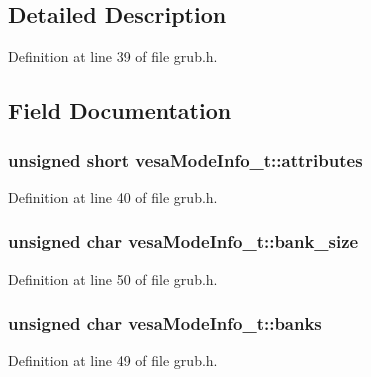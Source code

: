 \subsection{Detailed Description}


Definition at line 39 of file grub.\+h.



\subsection{Field Documentation}
\hypertarget{structvesaModeInfo__t_a339145bcfb50fc81609813734415d4db}{
\subsubsection[{attributes}]{\setlength{\rightskip}{0pt plus 5cm}unsigned short vesa\+Mode\+Info\+\_\+t\+::attributes}}\label{structvesaModeInfo__t_a339145bcfb50fc81609813734415d4db}


Definition at line 40 of file grub.\+h.

\hypertarget{structvesaModeInfo__t_a6f7476f0df157c2fc8969131512a9bc1}{
\subsubsection[{bank\+\_\+size}]{\setlength{\rightskip}{0pt plus 5cm}unsigned char vesa\+Mode\+Info\+\_\+t\+::bank\+\_\+size}}\label{structvesaModeInfo__t_a6f7476f0df157c2fc8969131512a9bc1}


Definition at line 50 of file grub.\+h.

\hypertarget{structvesaModeInfo__t_a543f6b11b8caed004dc0f4dd8fed13c8}{
\subsubsection[{banks}]{\setlength{\rightskip}{0pt plus 5cm}unsigned char vesa\+Mode\+Info\+\_\+t\+::banks}}\label{structvesaModeInfo__t_a543f6b11b8caed004dc0f4dd8fed13c8}


Definition at line 49 of file grub.\+h.

